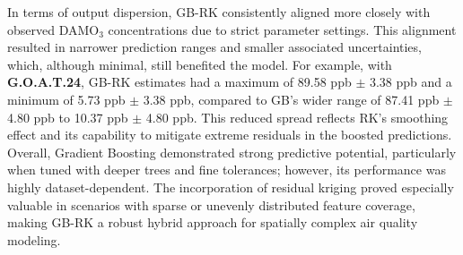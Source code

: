 In terms of output dispersion, GB-RK consistently aligned more closely with observed DAMO$_3$ concentrations due to strict parameter settings. This alignment resulted in narrower prediction ranges and smaller associated uncertainties, which, although minimal, still benefited the model. For example, with \textbf{G.O.A.T.24}, GB-RK estimates had a maximum of 89.58 ppb $\pm$ 3.38 ppb and a minimum of 5.73 ppb $\pm$ 3.38 ppb, compared to GB’s wider range of 87.41 ppb $\pm$ 4.80 ppb to 10.37 ppb $\pm$ 4.80 ppb. This reduced spread reflects RK’s smoothing effect and its capability to mitigate extreme residuals in the boosted predictions. Overall, Gradient Boosting demonstrated strong predictive potential, particularly when tuned with deeper trees and fine tolerances; however, its performance was highly dataset-dependent. The incorporation of residual kriging proved especially valuable in scenarios with sparse or unevenly distributed feature coverage, making GB-RK a robust hybrid approach for spatially complex air quality modeling.
